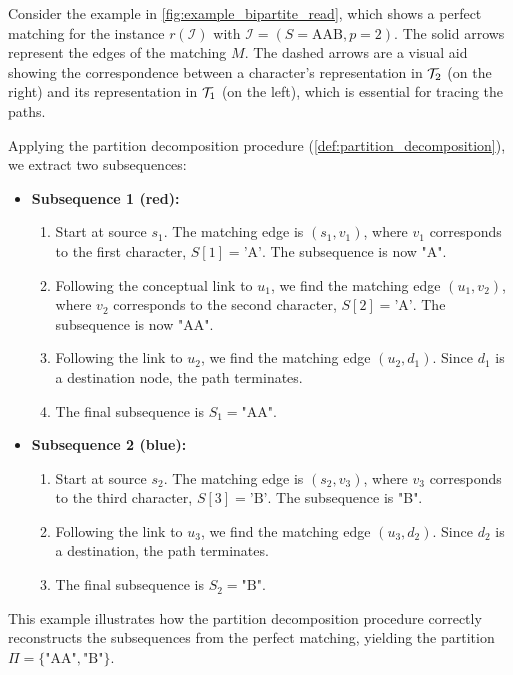\begin{example}
    Consider the example in \cref{fig:example_bipartite_read}, which shows a perfect matching for the instance $r(\mathcal{I})$ with $\mathcal{I}=(S=\text{AAB}, p=2)$. The solid arrows represent the edges of the matching $M$. The dashed arrows are a visual aid showing the correspondence between a character's representation in $\mathcal{T}_{2}$ (on the right) and its representation in $\mathcal{T}_{1}$ (on the left), which is essential for tracing the paths.

    Applying the partition decomposition procedure (\cref{def:partition_decomposition}), we extract two subsequences:

    \begin{itemize}
        \item \textbf{Subsequence 1 (red):}
        \begin{enumerate}
            \item Start at source $s_1$. The matching edge is $(s_1, v_1)$, where $v_1$ corresponds to the first character, $S[1] = \text{'A'}$. The subsequence is now "A".
            \item Following the conceptual link to $u_1$, we find the matching edge $(u_1, v_2)$, where $v_2$ corresponds to the second character, $S[2] = \text{'A'}$. The subsequence is now "AA".
            \item Following the link to $u_2$, we find the matching edge $(u_2, d_1)$. Since $d_1$ is a destination node, the path terminates.
            \item The final subsequence is $S_1 = \text{"AA"}$.
        \end{enumerate}

        \item \textbf{Subsequence 2 (blue):}
        \begin{enumerate}
            \item Start at source $s_2$. The matching edge is $(s_2, v_3)$, where $v_3$ corresponds to the third character, $S[3] = \text{'B'}$. The subsequence is "B".
            \item Following the link to $u_3$, we find the matching edge $(u_3, d_2)$. Since $d_2$ is a destination, the path terminates.
            \item The final subsequence is $S_2 = \text{"B"}$.
        \end{enumerate}
    \end{itemize}
    This example illustrates how the partition decomposition procedure correctly reconstructs the subsequences from the perfect matching, yielding the partition $\Pi = \{\text{"AA"}, \text{"B"}\}$.
    \begin{figure}[H]
        \centering
\end{figure}
\end{example}
